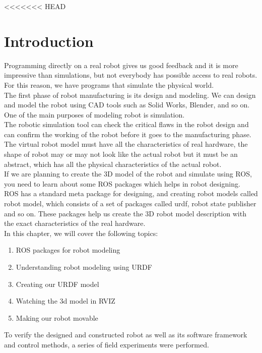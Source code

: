 <<<<<<< HEAD

		\section{Introduction}
	Programming directly on a real robot gives us good feedback and it is more impressive
	than simulations, but not everybody has possible access to real robots. For this reason,
	we have programs that simulate the physical world.\\
	The first phase of robot manufacturing is its design and modeling. We can design and model the 
	robot using CAD tools such as Solid Works, Blender, and so on. One of the main purposes 
	of modeling robot is simulation.
	\\The robotic simulation tool can check the critical flaws in the robot design and can confirm the 
	working of the robot before it goes to the manufacturing phase.
	\\The virtual robot model must have all the characteristics of real hardware, the shape of robot 
	may or may not look like the actual robot but it must be an abstract, which has all the physical 
	characteristics of the actual robot.
	\\If we are planning to create the 3D model of the robot and simulate using ROS, you need to learn 
	about some ROS packages which helps in robot designing.
	\\ ROS has a standard meta package for designing, and creating robot models called robot model, 
	which consists of a set of packages called urdf, robot state publisher and so on. 
	These packages help us create the 3D robot model description with the exact characteristics of the 
	real hardware.
	\\ In this chapter, we will cover the following topics:
	\begin{enumerate}
		\item ROS packages for robot modeling
		
		\item    Understanding robot modeling using URDF
		
		\item    Creating our URDF model
		
		\item   Watching the 3d model in RVIZ
		\item   Making our robot movable
		
	\end{enumerate}
	To verify the designed and constructed robot as well as its software framework and control methods, a series of field experiments were performed.
